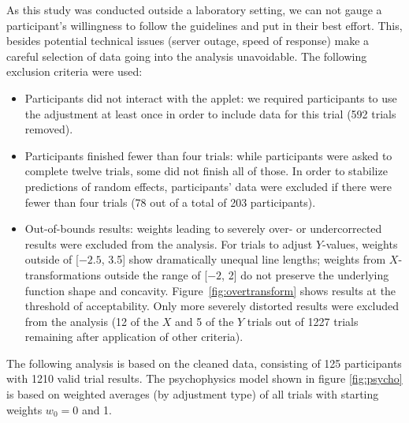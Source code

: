 \documentclass[11pt]{isuthesis}\usepackage[]{graphicx}\usepackage[]{color}
\begin{document}
As this study was conducted outside a laboratory setting, we can not gauge a participant's willingness to follow the guidelines and put in their best effort. This, besides potential technical issues (server outage, speed of response) make a careful selection of data going into the analysis unavoidable. The following exclusion criteria were used:
\begin{itemize}
\item Participants did not interact with the applet: we required participants to use the adjustment at least once in order to include data for this trial (592 trials removed).
\item Participants finished fewer than four trials: while participants were asked to complete twelve trials, some did not finish all of those. In order to stabilize predictions of random effects, participants' data were excluded if there were fewer than four trials (78 out of a total of 203 participants).
\item Out-of-bounds results: weights leading to severely over- or undercorrected results were excluded from the analysis. 
For trials to adjust $Y$-values, weights outside of [\ensuremath{-2.5}, 3.5]  show dramatically unequal line lengths; weights from $X$-transformations outside the range of [\ensuremath{-2}, 2] do not preserve the underlying function shape and concavity. 
Figure~\ref{fig:overtransform} shows results at the threshold of acceptability. Only more severely distorted results were excluded from the analysis (12 of the $X$ and 5 of the $Y$ trials out of 1227 trials remaining after application of other criteria).
\end{itemize}


The following analysis is based on the cleaned data, consisting of 125 participants with 1210 valid trial results. The psychophysics model shown in figure \ref{fig:psycho} is based on  weighted averages (by adjustment type) of all trials with starting weights $w_0 = 0$ and 1.
\end{document}
